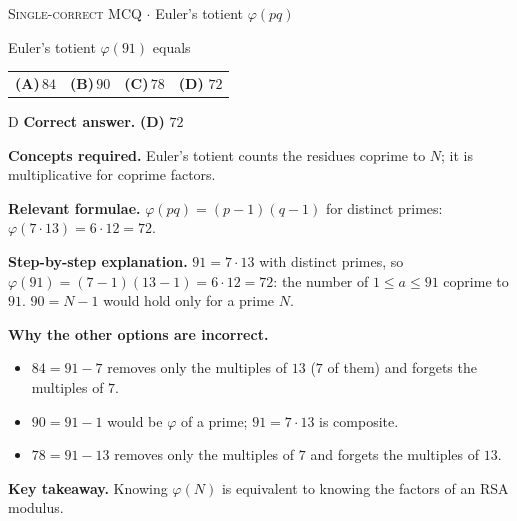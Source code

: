 \documentclass[11pt,a4paper]{article}
\newcommand{\optlabel}[1]{\textbf{(#1)}}
\newcommand{\correctlabel}[1]{\textcolor{okgreen}{\textbf{(#1)}\,\ding{51}}}
\newenvironment{qitem}[1]{\begin{list}{}{\setlength{\leftmargin}{3.3em}\setlength{\labelwidth}{3.1em}%
  \setlength{\labelsep}{0.2em}\setlength{\topsep}{3pt}\setlength{\parsep}{3pt}}\item[\textbf{Q.#1}\hfill]}{\end{list}}
\newcommand{\qsep}{\par\vspace{2pt}{\color{black!15}\hrule}\vspace{4pt}}
\newcommand{\qmeta}[2]{{\footnotesize\color{black!60}\textsc{#1} \;$\cdot$\; #2}\par}
\begin{document}
\begin{qitem}{3}
\qmeta{Single-correct MCQ}{Euler's totient $\varphi(pq)$}
Euler's totient $\varphi(91)$ equals
\par\smallskip\noindent\begin{tabularx}{\linewidth}{@{}*{4}{L}@{}}
\optlabel{A}\,$84$ & \optlabel{B}\,$90$ & \optlabel{C}\,$78$ & \correctlabel{D}\,$72$
\end{tabularx}
\end{qitem}
\begin{solbox}{D}
\textbf{\color{brand}Correct answer.} \textcolor{okgreen}{\textbf{(D)}} $72$

\textbf{\color{brand}Concepts required.} Euler's totient counts the residues coprime to $N$; it is multiplicative for coprime factors.

\textbf{\color{brand}Relevant formulae.} $\varphi(pq) = (p - 1)(q - 1)$ for distinct primes: $\varphi(7\cdot13) = 6\cdot12 = 72$.

\textbf{\color{brand}Step-by-step explanation.} $91 = 7\cdot13$ with distinct primes, so $\varphi(91) = (7-1)(13-1) = 6\cdot12 = 72$: the number of $1 \le a \le 91$ coprime to $91$.
$90 = N - 1$ would hold only for a prime $N$.

\textbf{\color{brand}Why the other options are incorrect.}
\begin{itemize}[leftmargin=2.4em, itemsep=1pt, topsep=2pt]
\item[\textbf{(A)}] $84 = 91 - 7$ removes only the multiples of $13$ ($7$ of them) and forgets the multiples of $7$.
\item[\textbf{(B)}] $90 = 91 - 1$ would be $\varphi$ of a prime; $91 = 7\cdot13$ is composite.
\item[\textbf{(C)}] $78 = 91 - 13$ removes only the multiples of $7$ and forgets the multiples of $13$.
\end{itemize}
\textbf{\color{brand}Key takeaway.} Knowing $\varphi(N)$ is equivalent to knowing the factors of an RSA modulus.
\end{solbox}
\qsep
\end{document}
